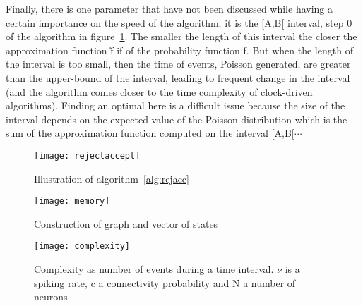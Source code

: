 	Finally, there is one parameter that have not been discussed while having a certain importance on the speed of the algorithm, it is the [A,B[ interval, step 0 of the algorithm in figure~\ref{fig:rejacc}. The smaller the length of this interval the closer the approximation function \~f if of the probability function f. But when the length of the interval is too small, then the time of events, Poisson generated, are greater than the upper-bound of the interval, leading to frequent change in the interval (and the algorithm comes closer to the time complexity of clock-driven algorithms). Finding an optimal here is a difficult issue because the size of the interval depends on the expected value of the Poisson distribution which is the sum of the approximation function computed on the interval [A,B[$\cdots$
	\begin{landscape}
		\begin{figure}
			\begin{center}
				\texttt{[image: rejectaccept]}
			\end{center}
			\caption{Illustration of algorithm~\ref{alg:rejacc}}\label{fig:rejacc}
		\end{figure}
	\end{landscape}
	\begin{landscape}
		\begin{figure}
			\texttt{[image: memory]}
			\caption{Construction of graph and vector of states}
			\label{fig:construction}
		\end{figure}
	\end{landscape}
	\begin{landscape}
		\begin{figure}
			\centering
			\texttt{[image: complexity]}
			\caption{Complexity as number of events during a time interval. $\nu$ is a spiking rate, c a connectivity probability and N a number of neurons.}\label{fig:complexity}
		\end{figure}
	\end{landscape}